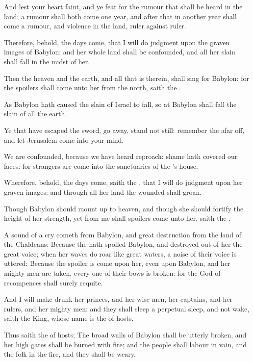 \Verse And lest your heart faint, and ye fear for the rumour that shall be heard in the land; a rumour shall both come one year, and after that in another year shall come a rumour, and violence in the land, ruler against ruler.

\Verse Therefore, behold, the days come, that I will do judgment upon the graven images of Babylon: and her whole land shall be confounded, and all her slain shall fall in the midst of her.

\Verse Then the heaven and the earth, and all that is therein, shall sing for Babylon: for the spoilers shall come unto her from the north, saith the \LORD.

\Verse As Babylon hath caused the slain of Israel to fall, so at Babylon shall fall the slain of all the earth.

\Verse Ye that have escaped the sword, go away, stand not still: remember the \LORD afar off, and let Jerusalem come into your mind.

\Verse We are confounded, because we have heard reproach: shame hath covered our faces: for strangers are come into the sanctuaries of the \LORD's house.

\Verse Wherefore, behold, the days come, saith the \LORD, that I will do judgment upon her graven images: and through all her land the wounded shall groan.

\Verse Though Babylon should mount up to heaven, and though she should fortify the height of her strength, yet from me shall spoilers come unto her, saith the \LORD.

\Verse A sound of a cry cometh from Babylon, and great destruction from the land of the Chaldeans: \Verse Because the \LORD hath spoiled Babylon, and destroyed out of her the great voice; when her waves do roar like great waters, a noise of their voice is uttered: \Verse Because the spoiler is come upon her, even upon Babylon, and her mighty men are taken, every one of their bows is broken: for the \LORD God of recompences shall surely requite.

\Verse And I will make drunk her princes, and her wise men, her captains, and her rulers, and her mighty men: and they shall sleep a perpetual sleep, and not wake, saith the King, whose name is the \LORD of hosts.

\Verse Thus saith the \LORD of hosts; The broad walls of Babylon shall be utterly broken, and her high gates shall be burned with fire; and the people shall labour in vain, and the folk in the fire, and they shall be weary.

